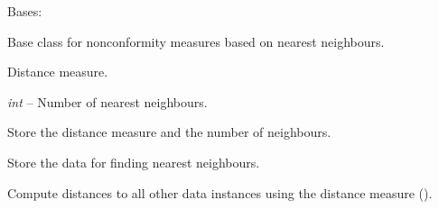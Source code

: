 \documentclass[letterpaper,10pt,english]{sphinxmanual}
\begin{document}
\begin{fulllineitems}
\label{cp.nonconformity:cp.nonconformity.NearestNeighbours}
Bases: 

Base class for nonconformity measures based on nearest neighbours.

\begin{fulllineitems}
\label{cp.nonconformity:cp.nonconformity.NearestNeighbours.distance}
Distance measure.

\end{fulllineitems}


\begin{fulllineitems}
\label{cp.nonconformity:cp.nonconformity.NearestNeighbours.k}
\emph{int} -- Number of nearest neighbours.

\end{fulllineitems}


\begin{fulllineitems}
\label{cp.nonconformity:cp.nonconformity.NearestNeighbours.__init__}
Store the distance measure and the number of neighbours.

\end{fulllineitems}


\begin{fulllineitems}
\label{cp.nonconformity:cp.nonconformity.NearestNeighbours.fit}
Store the data for finding nearest neighbours.

\end{fulllineitems}


\begin{fulllineitems}
\label{cp.nonconformity:cp.nonconformity.NearestNeighbours.neighbours}
Compute distances to all other data instances using the distance measure ({\hyperref[cp.nonconformity:cp.nonconformity.NearestNeighbours.distance]{}}).


\end{fulllineitems}
\end{fulllineitems}
\end{document}

